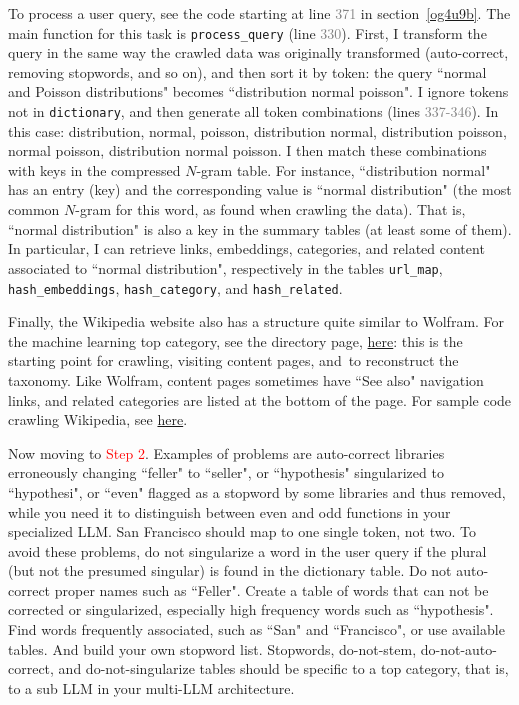 \documentclass[oneside,10pt]{book}
\begin{document}
To process a user query, see the code starting at line \textcolor{gray}{371} in section~\ref{og4u9b}. The main function for this task
 is \texttt{process\_query} (line \textcolor{gray}{330}). First, I \textcolor{index}{transform} the query in the same way the crawled data was originally transformed (auto-correct, removing stopwords, and so on), and then sort it by token: the query ``normal and Poisson distributions" becomes ``distribution normal poisson".
I ignore tokens not in \texttt{dictionary}, and then generate all token combinations (lines \textcolor{gray}{337-346}). In this case:
distribution, normal,  poisson,  distribution normal, distribution poisson, normal poisson, distribution normal poisson. 
I then match these combinations with keys in the compressed \textcolor{index}{$N$-gram} table. For instance, ``distribution normal" has an entry (key) and the corresponding value 
 is ``normal distribution" (the most common $N$-gram for this word, as found when crawling the data). That is, ``normal distribution" is also a key in the summary tables (at least some of them). In particular, I can retrieve links, embeddings, categories,  and related content associated to ``normal distribution", 
respectively in the tables \texttt{url\_map}, \texttt{hash\_embeddings}, \texttt{hash\_category}, and \texttt{hash\_related}. 

Finally, the Wikipedia website also has a structure quite similar to Wolfram. For the machine learning top category, see the directory page, 
 \href{https://en.wikipedia.org/wiki/Category:Machine_learning}{here}: 
this is the starting point for crawling, visiting content pages, and~to reconstruct the taxonomy. Like Wolfram, content pages sometimes 
have ``See also" navigation links, and related categories are listed at the bottom of the page. 
For sample code crawling Wikipedia, see \href{https://github.com/rajiviyer/llm/blob/main/wikipedia_ml_scraping.ipynb}{here}.

Now moving to \textcolor{red}{Step 2}. Examples of problems are auto-correct libraries erroneously changing ``feller" to ``seller", or 
 ``hypothesis" singularized to ``hypothesi", or ``even" flagged as a \textcolor{index}{stopword} by some libraries and thus removed, while you need it to distinguish between even and odd
 functions in your specialized LLM. San Francisco should map to one single token, not two. To avoid these problems, do not singularize a word in the user query if the plural (but not the presumed singular) is found in the dictionary table.
Do not auto-correct proper names such as ``Feller". Create a table of words that can not be corrected or singularized, especially high frequency words 
such as ``hypothesis". Find words frequently associated, such as ``San" and ``Francisco", or use available tables.  
And build your own stopword list. Stopwords, do-not-stem, do-not-auto-correct, and do-not-singularize tables should be specific to
 a top category, that is, to a sub LLM in your multi-LLM architecture. 
\end{document}

